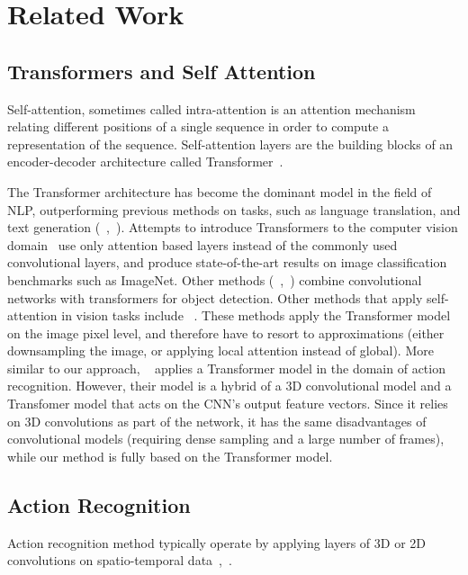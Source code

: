 \documentclass[10pt,twocolumn,letterpaper]{article}
\begin{document}
 
\section{Related Work}
\subsection{Transformers and Self Attention}
Self-attention, sometimes called intra-attention is an attention mechanism relating different positions of a single sequence in order to compute a representation of the sequence.
Self-attention layers are the building blocks of an encoder-decoder architecture called Transformer~\cite{vaswani2017attention}. 

The Transformer architecture has become the dominant model in the field of NLP, outperforming previous methods on  tasks, such as language translation, and text generation (~\cite{devlin2018bert},~\cite{vaswani2017attention}). Attempts to introduce Transformers to the computer vision domain~\cite{dosovitskiy2021an, touvron2020training} use only attention based layers instead of the commonly used convolutional layers, and produce state-of-the-art results on image classification benchmarks such as ImageNet.
Other methods (~\cite{carion2020end},~\cite{Hu_2018_CVPR}) combine convolutional networks with transformers for object detection.
Other methods that apply self-attention in vision tasks include ~\cite{Wang_2018_CVPR, pmlr-v80-parmar18a, NEURIPS2019_3416a75f, Cordonnier2020On}. These methods apply the Transformer model on the image pixel level, and therefore have to resort to approximations (either downsampling the image, or applying local attention instead of global).  
More similar to our approach, ~\cite{kalfaoglu2020late} applies a Transformer model in the domain of action recognition.  However, their model is a hybrid of a 3D convolutional model and a Transfomer model that acts on the CNN's output feature vectors.  Since it relies on 3D convolutions as part of the network, it has the same disadvantages of convolutional models (requiring dense sampling and a large number of frames), while our method is fully based on the Transformer model. 




\subsection{Action Recognition}
Action recognition method typically operate by applying layers of 3D or 2D convolutions on spatio-temporal data~\cite{feichtenhofer2019slowfast, feichtenhofer2020x3d},~\cite{carreira2017quo, tran2018closer}.
\end{document}
